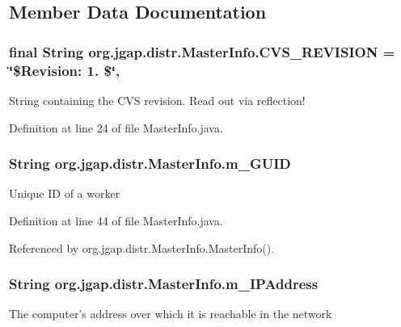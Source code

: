 \subsection{Member Data Documentation}
\hypertarget{classorg_1_1jgap_1_1distr_1_1_master_info_a3153200de7efe89f2bc5500d9530656c}{
\subsubsection[{C\-V\-S\-\_\-\-R\-E\-V\-I\-S\-I\-O\-N}]{\setlength{\rightskip}{0pt plus 5cm}final String org.\-jgap.\-distr.\-Master\-Info.\-C\-V\-S\-\_\-\-R\-E\-V\-I\-S\-I\-O\-N = \char`\"{}\$Revision\-: 1. \$\char`\"{}\hspace{0.3cm}{\ttfamily [static]}, {\ttfamily [private]}}}\label{classorg_1_1jgap_1_1distr_1_1_master_info_a3153200de7efe89f2bc5500d9530656c}
String containing the C\-V\-S revision. Read out via reflection! 

Definition at line 24 of file Master\-Info.\-java.

\hypertarget{classorg_1_1jgap_1_1distr_1_1_master_info_a836cdfff258f263824cdc3fd173ec409}{
\subsubsection[{m\-\_\-\-G\-U\-I\-D}]{\setlength{\rightskip}{0pt plus 5cm}String org.\-jgap.\-distr.\-Master\-Info.\-m\-\_\-\-G\-U\-I\-D}}\label{classorg_1_1jgap_1_1distr_1_1_master_info_a836cdfff258f263824cdc3fd173ec409}
Unique I\-D of a worker 

Definition at line 44 of file Master\-Info.\-java.



Referenced by org.\-jgap.\-distr.\-Master\-Info.\-Master\-Info().

\hypertarget{classorg_1_1jgap_1_1distr_1_1_master_info_abc21071ddb29dafb7b784c4994df1b32}{
\subsubsection[{m\-\_\-\-I\-P\-Address}]{\setlength{\rightskip}{0pt plus 5cm}String org.\-jgap.\-distr.\-Master\-Info.\-m\-\_\-\-I\-P\-Address}}\label{classorg_1_1jgap_1_1distr_1_1_master_info_abc21071ddb29dafb7b784c4994df1b32}
The computer's address over which it is reachable in the network 

